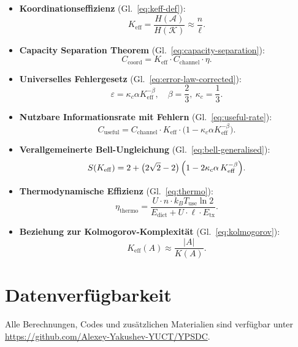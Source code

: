 \documentclass[12pt,a4paper]{article}
\theoremstyle{remark}
\newcommand{\Keff}{K_{\mathrm{eff}}}
\begin{document}
	\begin{itemize}
		\item \textbf{Koordinationseffizienz} (Gl.~\eqref{eq:keff-def}):
		\[
		\Keff = \frac{H(\mathcal{A})}{H(\mathcal{K})} \approx \frac{n}{\ell}.
		\]
		
		\item \textbf{Capacity Separation Theorem} (Gl.~\eqref{eq:capacity-separation}):
		\[
		C_{\text{coord}} = \Keff \cdot C_{\text{channel}} \cdot \eta.
		\]
		
		\item \textbf{Universelles Fehlergesetz} (Gl.~\eqref{eq:error-law-corrected}):
		\[
		\varepsilon = \kappa_c \alpha K_{\mathrm{eff}}^{-\beta}, \quad \beta = \frac{2}{3},\ \kappa_c = \frac{1}{3}.
		\]
		
		\item \textbf{Nutzbare Informationsrate mit Fehlern} (Gl.~\eqref{eq:useful-rate}):
		\[
		C_{\text{useful}} = C_{\text{channel}} \cdot \Keff \cdot \bigl(1 - \kappa_c \alpha K_{\mathrm{eff}}^{-\beta}\bigr).
		\]
		
		\item \textbf{Verallgemeinerte Bell-Ungleichung} (Gl.~\eqref{eq:bell-generalised}):
		\[
		S(K_{\mathrm{eff}}) = 2 + \bigl(2\sqrt{2}-2\bigr)\,\Bigl(1 - 2\kappa_c\alpha\,K_{\mathrm{eff}}^{-\beta}\Bigr).
		\]
		
		\item \textbf{Thermodynamische Effizienz} (Gl.~\eqref{eq:thermo}):
		\[
		\eta_{\text{thermo}} = \frac{U \cdot n \cdot k_B T_{\text{use}} \ln 2}{E_{\text{dict}} + U \cdot \ell \cdot E_{\text{tx}}}.
		\]
		
		\item \textbf{Beziehung zur Kolmogorov-Komplexität} (Gl.~\eqref{eq:kolmogorov}):
		\[
		\Keff(A) \approx \frac{|A|}{K(A)}.
		\]
	\end{itemize}
	
	\section*{Datenverfügbarkeit}
	
	Alle Berechnungen, Codes und zusätzlichen Materialien sind verfügbar unter \url{https://github.com/Alexey-Yakushev-YUCT/YPSDC}.
	
\end{document}
